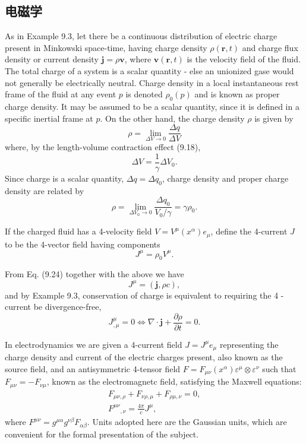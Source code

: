 \documentclass[hyperref,UTF8]{ctexbook}
\begin{document}
\subsection{电磁学}
As in Example 9.3, let there be a continuous distribution of electric charge present in Minkowski space-time, having charge density $\rho(\mathbf{r}, t)$ and charge flux density or current density $\mathbf{j}=\rho \mathbf{v}$, where $\mathbf{v}(\mathbf{r}, t)$ is the velocity field of the fluid. The total charge of a system is a scalar quantity - else an unionized gase would not generally be electrically neutral. Charge density in a local instantaneous rest frame of the fluid at any event $p$ is denoted $\rho_0(p)$ and is known as proper charge density. It may be assumed to be a scalar quantity, since it is defined in a specific inertial frame at $p$. On the other hand, the charge density $\rho$ is given by
$$
\rho=\lim _{\Delta V \rightarrow 0} \frac{\Delta q}{\Delta V}
$$
where, by the length-volume contraction effect (9.18),
$$
\Delta V=\frac{1}{\gamma} \Delta V_0 .
$$
Since charge is a scalar quantity, $\Delta q=\Delta q_0$, charge density and proper charge density are related by
$$
\rho=\lim _{\Delta V_0 \rightarrow 0} \frac{\Delta q_0}{V_0 / \gamma}=\gamma \rho_0 .
$$

If the charged fluid has a 4-velocity field $V=V^\mu\left(x^\alpha\right) e_\mu$, define the 4-current $J$ to be the 4-vector field having components
$$
J^\mu=\rho_0 V^\mu .
$$

From Eq. (9.24) together with the above we have
$$
J^\mu=(\mathbf{j}, \rho c),
$$
and by Example 9.3, conservation of charge is equivalent to requiring the 4 -current be divergence-free,
$$
J_{, \mu}^\mu=0 \Longleftrightarrow \nabla \cdot \mathbf{j}+\frac{\partial \rho}{\partial t}=0 .
$$

In electrodynamics we are given a 4-current field $J=J^\mu e_\mu$ representing the charge density and current of the electric charges present, also known as the source field, and an antisymmetric 4-tensor field $F=F_{\mu \nu}\left(x^\alpha\right) \varepsilon^\mu \otimes \varepsilon^\nu$ such that $F_{\mu \nu}=-F_{\nu \mu}$, known as the electromagnetc field, satisfying the Maxwell equations:
$$
\begin{gathered}
F_{\mu \nu, \rho}+F_{\nu \rho, \mu}+F_{\rho \mu, \nu}=0, \\
F^{\mu \nu}{ }_{, \nu}=\frac{4 \pi}{c} J^\mu,
\end{gathered}
$$
where $F^{\mu \nu}=g^{\mu \alpha} g^{\nu \beta} F_{\alpha \beta}$. Units adopted here are the Gaussian units, which are convenient for the formal presentation of the subject.
\end{document}
